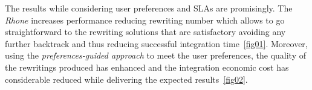 The results while considering user preferences and SLAs are promisingly.  
The \textit{Rhone} increases performance reducing rewriting number which allows to go straightforward to the rewriting solutions that are satisfactory avoiding any further backtrack and thus reducing successful integration time~\ref{fig01}. Moreover, using the \textit{preferences-guided approach} to meet the user preferences, the quality of the rewritings produced has enhanced and the integration economic cost has considerable reduced while delivering the expected results~\ref{fig02}.